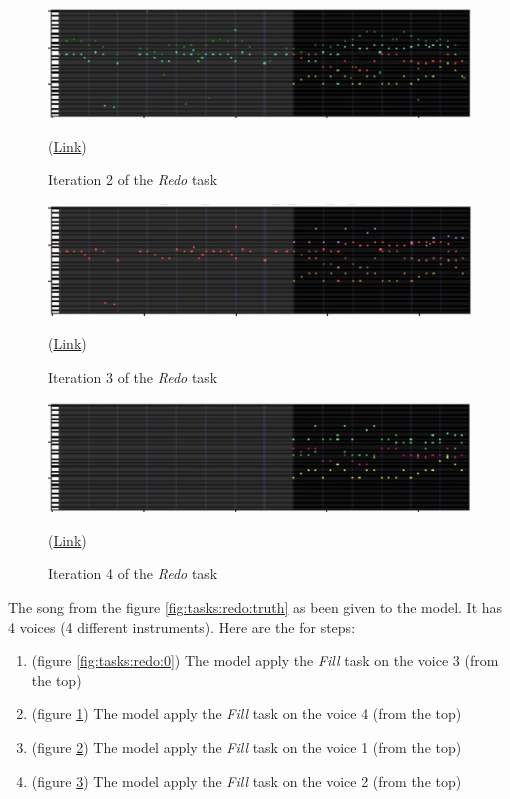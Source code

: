 \documentclass[12pt]{report}
\begin{document}
\begin{figure}[htbp]
    \centering
    \includegraphics[width=\textwidth]{images/generated_midis/tasks/redo/task-redo-1.jpg}
    \caption{Iteration 2 of the \textit{Redo} task}
    (\href{https://github.com/ValentinVignal/midiGenerator/blob/master/samples/tasks/redo_1_(inst_3).mid}{Link})
    \label{fig:tasks:redo:1}
\end{figure}

\begin{figure}[htbp]
    \centering
    \includegraphics[width=\textwidth]{images/generated_midis/tasks/redo/task-redo-2.jpg}
    \caption{Iteration 3 of the \textit{Redo} task}
    (\href{https://github.com/ValentinVignal/midiGenerator/blob/master/samples/tasks/redo_2_(inst_0).mid}{Link})
    \label{fig:tasks:redo:2}
\end{figure}

\begin{figure}[htbp]
    \centering
    \includegraphics[width=\textwidth]{images/generated_midis/tasks/redo/task-redo-3.jpg}
    \caption{Iteration 4 of the \textit{Redo} task}
    (\href{https://github.com/ValentinVignal/midiGenerator/blob/master/samples/tasks/redo_3_(inst_1).mid}{Link})
    \label{fig:tasks:redo:3}
\end{figure}

The song from the figure \ref{fig:tasks:redo:truth} as been given to the model.
It has 4 voices (4 different instruments).
Here are the for steps:
\begin{enumerate}
    \item (figure \ref{fig:tasks:redo:0}) The model apply the \textit{Fill} task on the voice 3 (from the top)
    \item (figure \ref{fig:tasks:redo:1}) The model apply the \textit{Fill} task on the voice 4 (from the top)
    \item (figure \ref{fig:tasks:redo:2}) The model apply the \textit{Fill} task on the voice 1 (from the top)
    \item (figure \ref{fig:tasks:redo:3}) The model apply the \textit{Fill} task on the voice 2 (from the top)
\end{enumerate}
\end{document}
